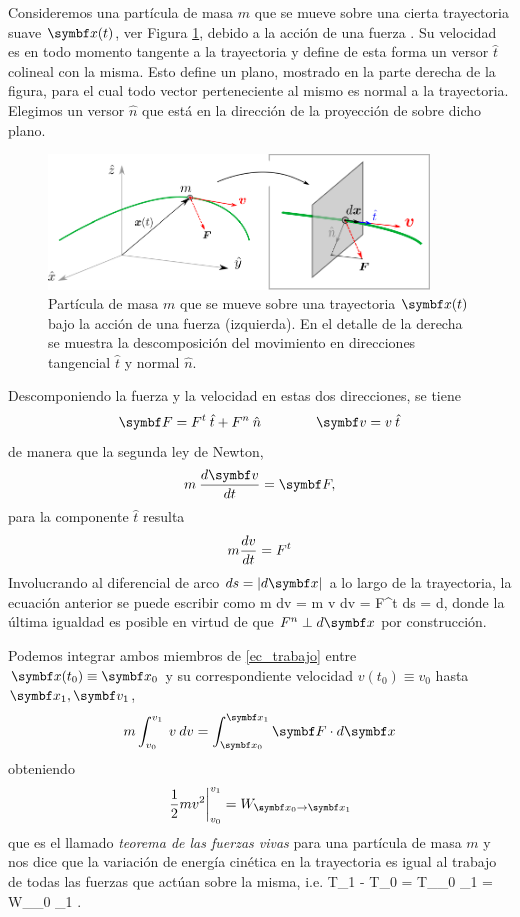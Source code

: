 \documentclass[10pt,oneside]{CBFT_book}
\begin{document}
Consideremos una partícula de masa $ m $ que se mueve sobre una cierta trayectoria suave $\vb{x}(t)$, ver {Figura} 
\ref{fig_mc_workenergy}, debido a la acción de una fuerza .
Su velocidad  es en todo momento tangente a la trayectoria y define de esta forma un versor $ \hat{t} $
colineal con la misma. Esto define un plano, mostrado en la parte derecha de la figura, para el cual todo vector
perteneciente al mismo es normal a la trayectoria. Elegimos un versor $ \hat{n} $ que está en la dirección de
la proyección de  sobre dicho plano.

\begin{figure}[!h]
	\begin{center}
	\includegraphics[width=0.9\textwidth]{images/fig_mc_workandenergy.pdf}	
	\end{center}
	\caption{Partícula de masa $m$ que se mueve sobre una trayectoria $\vb{x}(t)$ bajo la acción de una fuerza 
 (izquierda). En el detalle de la derecha se muestra la descomposición del movimiento en direcciones
tangencial $\hat{t}$ y normal $\hat{n}$.}
	\label{fig_mc_workenergy}
\end{figure} 

Descomponiendo la fuerza y la velocidad en estas dos direcciones, se tiene 
\[
	\vb{F} = F^t \: \hat{t}  + F^n \: \hat{n} \qquad \qquad \vb{v} = v \: \hat{t}
\]
de manera que la segunda ley de Newton, 
\[
	m \: \dtot{\vb{v}}{t} = \vb{F},
\]
para la componente $\hat{t}$ resulta
\[
	m \frac{d^{\hspace{-0.05em}} {v}}{d {t}^{\hspace{-0.05em}}} = F^t
\]
Involucrando al diferencial de arco $ ds = | d\vb{x} | $ a lo largo de la trayectoria, la ecuación anterior se
puede escribir como
\be
	m \: dv \: = m \: v \: dv = F^t \: ds =  \cdot d,
	\label{ec_trabajo}
\ee
donde la última igualdad es posible en virtud de que $ F^n \perp d\vb{x} $ por construcción.

Podemos integrar ambos miembros de \eqref{ec_trabajo} entre $\vb{x}(t_0) \equiv \vb{x}_0$ y su 
correspondiente velocidad $v(t_0) \equiv v_0$ hasta $\vb{x}_1, \vb{v}_1$, 
\[
	m \int_{v_0}^{v_1} \: v \: dv = \int_{\vb{x}_0}^{\vb{x}_1}  \vb{F} \cdot d\vb{x}
\]
obteniendo
\[
	\left. \frac{1}{2} m v^2 \right|_{v_0}^{v_1} = W_{\vb{x}_0 \to \vb{x}_1} 
\]
que es el llamado \emph{teorema de las fuerzas vivas} para una partícula de masa $m$ y nos dice que la
variación de energía cinética en la trayectoria es igual al trabajo de todas las fuerzas que actúan
sobre la misma, i.e.
\be
	T_1 - T_0 = \Delta T_{_0 \to {}_1}  = W_{_0 \to {}_1} .
	\label{conser_energia}
\ee
\end{document}

